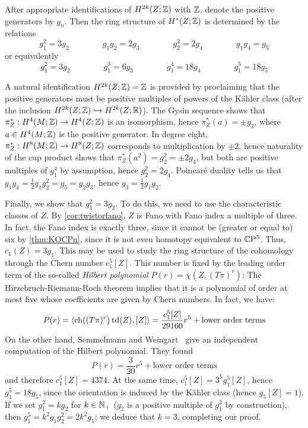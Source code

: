 \begin{prop}\label{prop:Zcohomology}
	After appropriate identifications of $H^{2k}(Z;\mathbb{Z})$ with $\mathbb{Z}$, denote the positive generators by $g_n$. Then the ring structure of $H^*(Z;\mathbb{Z})$ is determined by the relations
	\begin{equation*}
		g_1^2=3 g_2 \qquad \qquad g_1g_2=2g_3 \qquad \qquad g_2^2=2g_4 \qquad \qquad g_1g_4=g_5 
	\end{equation*}
	or equivalently
	\begin{equation*}
		g_1^2=3g_2\qquad \qquad g_1^3=6g_3 \qquad \qquad g_1^4=18g_4 \qquad \qquad g_1^5=18g_5
	\end{equation*}
\end{prop}
\begin{myproof}
	A natural identification $H^{2k}(Z;\mathbb{Z})=\mathbb{Z}$ is provided by proclaiming that the positive generators must be positive multiples of powers of the K\"ahler class (after the inclusion $H^{2k}(Z;\mathbb{Z})\hookrightarrow H^{2k}(Z;\mathbb{R})$). The Gysin sequence shows that $\pi_Z^*:H^4(M;\mathbb{Z}) \to H^4(Z;\mathbb{Z})$ is an isomorphism, hence $\pi_Z^*(a)=\pm g_2$, where $a\in H^4(M;\mathbb{Z})$ is the positive generator. In degree eight, $\pi_Z^*:H^8(M;\mathbb{Z})\to H^8(Z;\mathbb{Z})$ corresponds to multiplication by $\pm 2$, hence naturality of the cup product shows that $\pi_Z^*(a^2)=g_2^2=\pm 2 g_4$, but both are positive multiples of $g_1^4$ by assumption, hence $g_2^2=2g_4$. Poincar\'e duality tells us that $g_1g_4=\frac{1}{2}g_1g_2^2=g_5=g_2g_3$, hence $g_3=\frac{1}{2}g_1g_2$.
	
	Finally, we show that $g_1^2=3g_2$. To do this, we need to use the characteristic classes of $Z$. By \cref{cor:twistorfano}, $Z$ is Fano with Fano index a multiple of three. In fact, the Fano index is exactly three, since it cannot be (greater or equal to) six by \cref{thm:KOCPn}, since it is not even homotopy equivalent to $\mathbb{C}\mathrm{P}^5$. Thus, $c_1(Z)=3g_1$. This may be used to study the ring structure of the cohomology through the Chern number $c_1^5[Z]$. This number is fixed by the leading order term of the so-called \emph{Hilbert polynomial} $P(r)=\chi(Z,(T\pi)^r)$: The Hirzebruch-Riemann-Roch theorem implies that it is a polynomial of order at most five whose coefficients are given by Chern numbers. In fact, we have:
	\begin{equation*}
		P(r)=\langle\operatorname{ch}((T\pi)^r)\operatorname{td}(Z),[Z]\rangle
		=\frac{c_1^5[Z]}{29160}r^5+\text{lower order terms}
	\end{equation*}
	On the other hand, Semmelmann and Weingart~\cite{SW2004} give an independent computation of the Hilbert polynomial. They found
	\begin{equation*}
		P(r)=\frac{3}{20}r^5+\text{lower order terms}
	\end{equation*}
	and therefore $c_1^5[Z]=4374$. At the same time, $c_1^5[Z]=3^5g_1^5[Z]$, hence $g_1^5=18g_5$, since the orientation is induced by the K\"ahler class (hence $g_5[Z]=1$). If we set $g_1^2=kg_2$ for $k\in\mathbb{N}_+$ ($g_2$ is a positive multiple of $g_1^2$ by construction), then $g_1^5=k^2g_1g_2^2=2k^2g_5$; we deduce that $k=3$, completing our proof.
\end{myproof}

